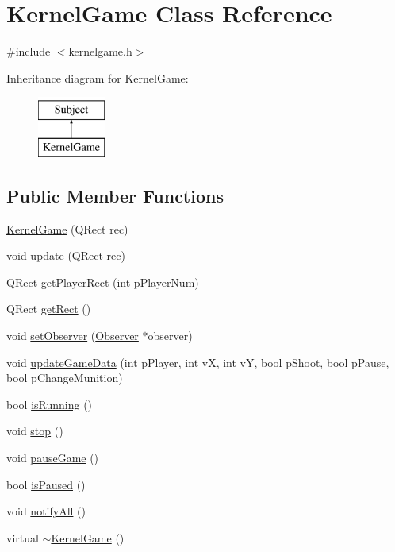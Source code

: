 \hypertarget{class_kernel_game}{\section{Kernel\-Game Class Reference}
\label{class_kernel_game}
}


{\ttfamily \#include $<$kernelgame.\-h$>$}

Inheritance diagram for Kernel\-Game\-:\begin{figure}[H]
\begin{center}
\leavevmode
\includegraphics[height=2.000000cm]{class_kernel_game}
\end{center}
\end{figure}
\subsection*{Public Member Functions}
\begin{DoxyCompactItemize}
\item 
\hyperlink{class_kernel_game_a8d0a3d38bb42bc8ba160f83d9555f395}{Kernel\-Game} (Q\-Rect rec)
\item 
void \hyperlink{class_kernel_game_ae621056ebdaf542603f970d35843f496}{update} (Q\-Rect rec)
\item 
Q\-Rect \hyperlink{class_kernel_game_a6c6c09460150307cff306ba8edb8f56d}{get\-Player\-Rect} (int p\-Player\-Num)
\item 
Q\-Rect \hyperlink{class_kernel_game_a1867078077d9bc0bed5ea8dc783e5d4a}{get\-Rect} ()
\item 
void \hyperlink{class_kernel_game_a57642ef798e299e27b18c392fbba563f}{set\-Observer} (\hyperlink{class_observer}{Observer} $\ast$observer)
\item 
void \hyperlink{class_kernel_game_a06ed912339d619fa11c246f71e6b5ce9}{update\-Game\-Data} (int p\-Player, int v\-X, int v\-Y, bool p\-Shoot, bool p\-Pause, bool p\-Change\-Munition)
\item 
bool \hyperlink{class_kernel_game_a739246ac9cc611c114c4e1557c5da966}{is\-Running} ()
\item 
void \hyperlink{class_kernel_game_ac5ed06e95095ddb80282fb15a4c843e3}{stop} ()
\item 
void \hyperlink{class_kernel_game_ab5a6993563f54d08ac85de2675e67395}{pause\-Game} ()
\item 
bool \hyperlink{class_kernel_game_ac543f811a6f50aed646502dc35f875d2}{is\-Paused} ()
\item 
void \hyperlink{class_kernel_game_afb01399b1b5d0e8b8bbbfb84466a7d20}{notify\-All} ()
\item 
virtual \hyperlink{class_kernel_game_a7236bcaef012f43108f3dd4087c3b9fc}{$\sim$\-Kernel\-Game} ()
\end{DoxyCompactItemize}
